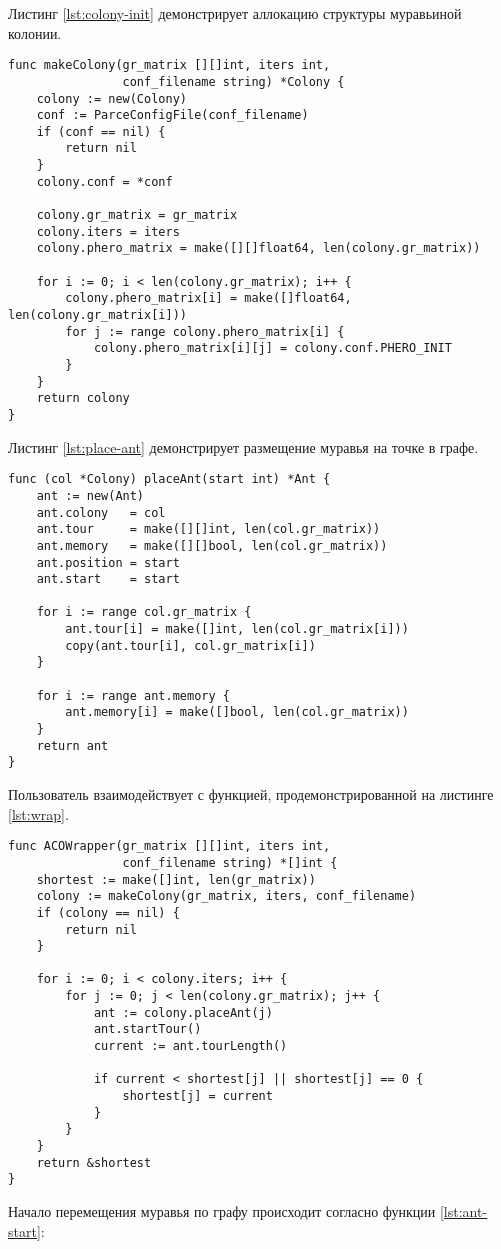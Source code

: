 Листинг \ref{lst:colony-init} демонстрирует аллокацию структуры муравьиной колонии.
\begin{lstlisting}[label=lst:colony-init,caption=Аллокация колонии]
func makeColony(gr_matrix [][]int, iters int, 
				conf_filename string) *Colony {
	colony := new(Colony)
	conf := ParceConfigFile(conf_filename)
	if (conf == nil) {
		return nil
	} 
	colony.conf = *conf

	colony.gr_matrix = gr_matrix
	colony.iters = iters
	colony.phero_matrix = make([][]float64, len(colony.gr_matrix))
	
	for i := 0; i < len(colony.gr_matrix); i++ {
		colony.phero_matrix[i] = make([]float64, len(colony.gr_matrix[i]))
		for j := range colony.phero_matrix[i] {
			colony.phero_matrix[i][j] = colony.conf.PHERO_INIT
		}
	}
	return colony
}
\end{lstlisting}

Листинг \ref{lst:place-ant} демонстрирует размещение муравья на точке в графе.
\begin{lstlisting}[label=lst:place-ant,caption=Размещение мурвья]
func (col *Colony) placeAnt(start int) *Ant {
	ant := new(Ant)
	ant.colony   = col
	ant.tour     = make([][]int, len(col.gr_matrix))
	ant.memory   = make([][]bool, len(col.gr_matrix))
	ant.position = start
	ant.start    = start
	
	for i := range col.gr_matrix {
		ant.tour[i] = make([]int, len(col.gr_matrix[i]))
		copy(ant.tour[i], col.gr_matrix[i])
	}

	for i := range ant.memory {
		ant.memory[i] = make([]bool, len(col.gr_matrix))
	}
	return ant
}
\end{lstlisting}

Пользователь взаимодействует с функцией, продемонстрированной на листинге \ref{lst:wrap}.
\begin{lstlisting}[label=lst:wrap,caption=Алгоритм муравьиной колонии]
func ACOWrapper(gr_matrix [][]int, iters int, 
				conf_filename string) *[]int {
	shortest := make([]int, len(gr_matrix))
	colony := makeColony(gr_matrix, iters, conf_filename)
	if (colony == nil) {
		return nil
	}
	
	for i := 0; i < colony.iters; i++ {
		for j := 0; j < len(colony.gr_matrix); j++ {
			ant := colony.placeAnt(j)
			ant.startTour()
			current := ant.tourLength()
			
			if current < shortest[j] || shortest[j] == 0 {
				shortest[j] = current
			}
		}
	}
	return &shortest
}
\end{lstlisting}
Начало перемещения муравья по графу происходит согласно функции \ref{lst:ant-start}:

